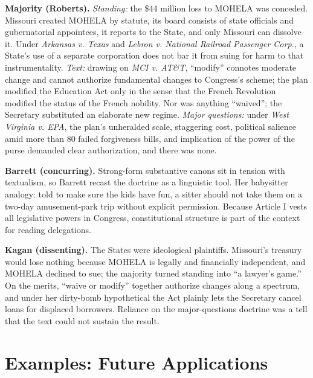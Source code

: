 \documentclass[12pt]{article}
\begin{document}
\textbf{Majority (Roberts).} \emph{Standing:} the \$44 million loss to MOHELA was conceded. Missouri created MOHELA by statute, its board consists of state officials and gubernatorial appointees, it reports to the State, and only Missouri can dissolve it. Under \textit{Arkansas v. Texas} and \textit{Lebron v. National Railroad Passenger Corp.}, a State's use of a separate corporation does not bar it from suing for harm to that instrumentality. \emph{Text:} drawing on \textit{MCI v. AT\&T}, ``modify'' connotes moderate change and cannot authorize fundamental changes to Congress's scheme; the plan modified the Education Act only in the sense that the French Revolution modified the status of the French nobility. Nor was anything ``waived''; the Secretary substituted an elaborate new regime. \emph{Major questions:} under \textit{West Virginia v. EPA}, the plan's unheralded scale, staggering cost, political salience amid more than 80 failed forgiveness bills, and implication of the power of the purse demanded clear authorization, and there was none.

\textbf{Barrett (concurring).} Strong-form substantive canons sit in tension with textualism, so Barrett recast the doctrine as a linguistic tool. Her babysitter analogy: told to make sure the kids have fun, a sitter should not take them on a two-day amusement-park trip without explicit permission. Because Article I vests all legislative powers in Congress, constitutional structure is part of the context for reading delegations.

\textbf{Kagan (dissenting).} The States were ideological plaintiffs. Missouri's treasury would lose nothing because MOHELA is legally and financially independent, and MOHELA declined to sue; the majority turned standing into ``a lawyer's game.'' On the merits, ``waive or modify'' together authorize changes along a spectrum, and under her dirty-bomb hypothetical the Act plainly lets the Secretary cancel loans for displaced borrowers. Reliance on the major-questions doctrine was a tell that the text could not sustain the result.

\section{Examples: Future Applications}
\end{document}
